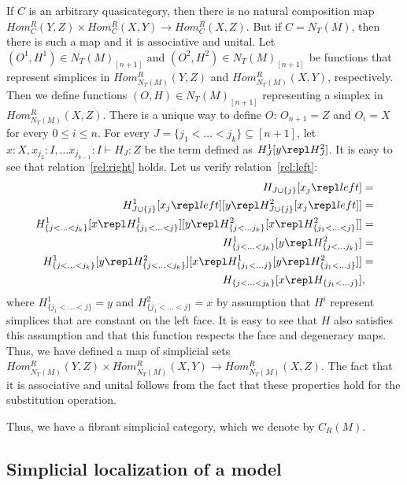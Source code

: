 If $C$ is an arbitrary quasicategory, then there is no natural composition map $Hom^R_C(Y,Z) \times Hom^R_C(X,Y) \to Hom^R_C(X,Z)$.
But if $C = N_T(M)$, then there is such a map and it is associative and unital.
Let $(O^1,H^1) \in N_T(M)_{[n+1]}$ and $(O^2,H^2) \in N_T(M)_{[n+1]}$ be functions that represent simplices in $Hom^R_{N_T(M)}(Y,Z)$ and $Hom^R_{N_T(M)}(X,Y)$, respectively.
Then we define functions $(O,H) \in N_T(M)_{[n+1]}$ representing a simplex in $Hom^R_{N_T(M)}(X,Z)$.
There is a unique way to define $O$: $O_{n+1} = Z$ and $O_i = X$ for every $0 \leq i \leq n$.
For every $J = \{ j_1 < \ldots < j_k \} \subseteq [n+1]$, let $x : X, x_{j_2} : I, \ldots x_{j_{k-1}} : I \vdash H_J : Z$ be the term defined as $H^1_J[y \repl H^2_J]$.
It is easy to see that relation~\eqref{rel:right} holds.
Let us verify relation~\eqref{rel:left}:
\begin{align*}
H_{J \cup \{j\}}[x_j \repl left] & = \\
H^1_{J \cup \{j\}}[x_j \repl left][y \repl H^2_{J \cup \{j\}}[x_j \repl left]] & = \\
H^1_{\{j < \ldots < j_k\}}[x \repl H^1_{\{j_1 < \ldots < j\}}][y \repl H^2_{\{j < \ldots j_k\}}[x \repl H^2_{\{j_1 < \ldots < j\}}]] & = \\
H^1_{\{j < \ldots < j_k\}}[y \repl H^2_{\{j < \ldots j_k\}}] & = \\
H^1_{\{j < \ldots < j_k\}}[y \repl H^2_{\{j < \ldots < j_k\}}][x \repl H^1_{\{j_1 < \ldots j\}}[y \repl H^2_{\{j_1 < \ldots j\}}]] & = \\
H_{\{j < \ldots < j_k\}}[x \repl H_{\{j_1 < \ldots j\}}] & ,
\end{align*}
where $H^1_{\{j_1 < \ldots < j\}} = y$ and $H^2_{\{j_1 < \ldots < j\}} = x$ by assumption that $H^i$ represent simplices that are constant on the left face.
It is easy to see that $H$ also satisfies this assumption and that this function respects the face and degeneracy maps.
Thus, we have defined a map of simplicial sets $Hom^R_{N_T(M)}(Y,Z) \times Hom^R_{N_T(M)}(X,Y) \to Hom^R_{N_T(M)}(X,Z)$.
The fact that it is associative and unital follows from the fact that these properties hold for the substitution operation.

Thus, we have a fibrant simplicial category, which we denote by $C_R(M)$.

\subsection{Simplicial localization of a model}

